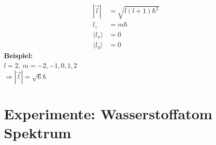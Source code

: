 
\begin{align*}
| \vec{l} | &= \sqrt{ l ( l+1) \hbar^2} \\
l_z &= m \hbar \\
\langle l_x \rangle &= 0 \\
\langle l_y \rangle &= 0
\end{align*}
\textbf{Beispiel:}\\
$ l=2 $, $ m = -2, -1, 0, 1, 2 $\\[5pt]
$ \Rightarrow |\vec{l}| = \sqrt{6}\hbar $



\section{Experimente: Wasserstoffatom Spektrum}

